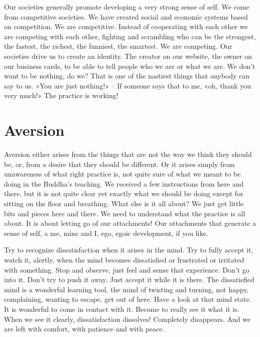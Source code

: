 \documentclass[letterpaper,10pt,english]{sphinxmanual}
\begin{document}
\sphinxAtStartPar
Our societies generally promote developing a very strong sense of self.
We come from competitive societies. We have created social and economic
  systems based on competition. We are competitive. Instead of cooperating
with each other we are competing with each other, fighting and scrambling
who can be the strongest, the fastest, the richest, the funniest, the smartest.
We are competing. Our societies drive us to create an identity. The creator on
our website, the owner on our business cards, to be able to tell people who
we are or what we are. We don’t want to be nothing, do we? That is one of
the nastiest things that anybody can say to us. «You are just nothing!» – If
someone says that to me, «oh, thank you very much!» The practice is working!


\section{Aversion}
\label{\detokenize{4-b:aversion}}
\sphinxAtStartPar
Aversion  either  arises  from  the  things  that  are  not  the  way  we  think
they should be, or, from a desire that they should be different. Or it arises
simply from unawareness of what right practice is, not quite sure of what we
meant to be doing in the Buddha’s teaching. We received a few instructions
from here and there, but it is not quite clear yet exactly what we should be
doing except for sitting on the floor and breathing. What else is it all about?
We just get little bits and pieces here and there. We need to understand what
the practice is all about. It is about letting go of our attachments! Our attachments that generate a sense of self, a me, mine and I, ego, egoic development, if you like.

\sphinxAtStartPar
Try to recognize dissatisfaction when it arises in the mind. Try to fully
accept it, watch it, alertly, when the mind becomes dissatisfied or frustrated
or irritated with something. Stop and observe, just feel and sense that experience. Don’t go into it. Don’t try to push it away. Just accept it while it is
there. The dissatisfied mind is a wonderful learning tool, the mind of twisting and turning, not happy, complaining, wanting to escape, get out of here.
Have a look at that mind state. It is wonderful to come in contact with it.
Become to really see it what it is. When we see it clearly, dissatisfaction dissolves! Completely disappears. And we are left with comfort, with patience
and with peace.
\end{document}
